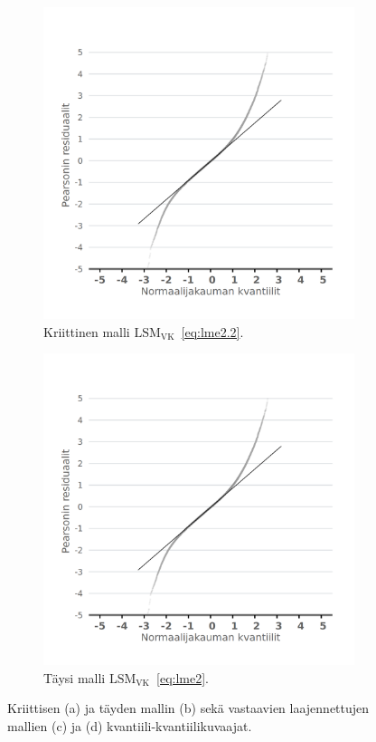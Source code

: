 \documentclass[finnish]{docopts}
\begin{document}
\begin{figure}[H]
\begin{subfigure}[b]{0.4\textwidth}
\centering
  \includegraphics[width=.8\linewidth]{kuvaajat/lme3_vc_qq.png}
  \caption{Kriittinen malli $\text{LSM}_{\text{VK}}$~\ref{eq:lme2.2}.}
  \label{fig:lme_vk_krit_qq}
\end{subfigure}%
\begin{subfigure}[b]{0.4\textwidth}
\centering
  \includegraphics[width=.8\linewidth]{kuvaajat/lme3_full_vc_qq.png}
  \caption{Täysi malli $\text{LSM}_{\text{VK}}$~\ref{eq:lme2}.}
  \label{fig:lme_vk_taysi_qq}
\end{subfigure}
 \caption{Kriittisen (a) ja täyden mallin (b) sekä vastaavien laajennettujen mallien (c) ja (d) kvantiili-kvantiilikuvaajat.}
   \label{fig:lme_resid_qq}
\end{figure}
\end{document}
